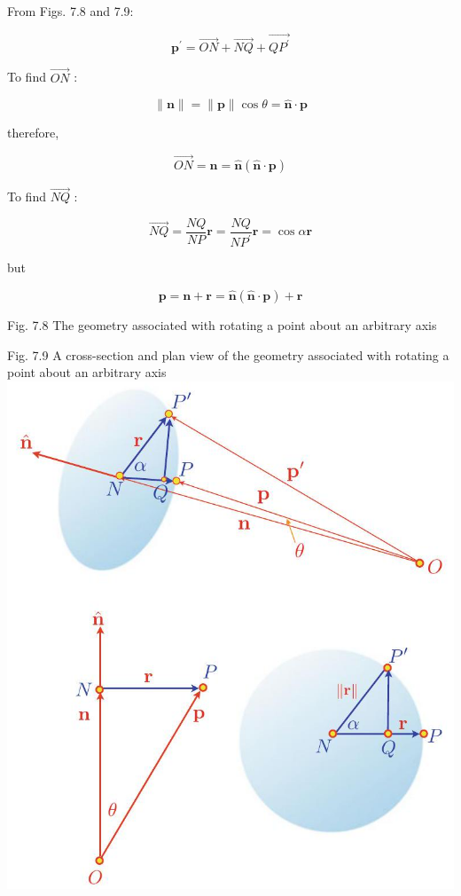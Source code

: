 \documentclass[10pt]{article}
\begin{document}
From Figs. 7.8 and 7.9:

$$
\mathbf{p}^{\prime}=\overrightarrow{O N}+\overrightarrow{N Q}+\overrightarrow{Q P^{\prime}}
$$

To find $\overrightarrow{O N}$ :

$$
\|\mathbf{n}\|=\|\mathbf{p}\| \cos \theta=\hat{\mathbf{n}} \cdot \mathbf{p}
$$

therefore,

$$
\overrightarrow{O N}=\mathbf{n}=\hat{\mathbf{n}}(\hat{\mathbf{n}} \cdot \mathbf{p})
$$

To find $\overrightarrow{N Q}$ :

$$
\overrightarrow{N Q}=\frac{N Q}{N P} \mathbf{r}=\frac{N Q}{N P^{\prime}} \mathbf{r}=\cos \alpha \mathbf{r}
$$

but

$$
\mathbf{p}=\mathbf{n}+\mathbf{r}=\hat{\mathbf{n}}(\hat{\mathbf{n}} \cdot \mathbf{p})+\mathbf{r}
$$

Fig. 7.8 The geometry associated with rotating a point about an arbitrary axis

Fig. 7.9 A cross-section and plan view of the geometry associated with rotating a point about an arbitrary axis
\includegraphics[max width=\textwidth, center]{2023_04_20_41f1ceac5a31dc7d1b59g-124}
\end{document}
